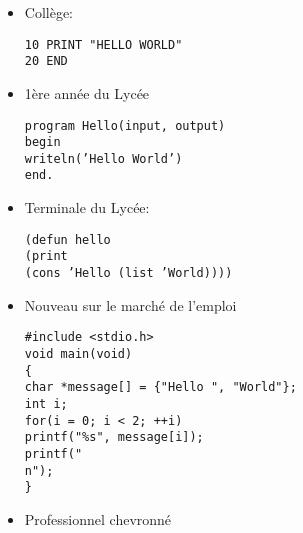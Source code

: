 \begin{itemize}
	\item Collège:

 \texttt{10 PRINT "HELLO WORLD"\\
20 END}

	\item 1ère année du Lycée

\texttt{program Hello(input, output)\\
begin\\
writeln('Hello World')\\
end.}

	\item Terminale du Lycée:
	
\texttt{(defun hello\\
(print\\
(cons 'Hello (list 'World))))}

	\item Nouveau sur le marché de l'emploi

\texttt{\#include <stdio.h>\\
void main(void)\\
\{\\
char *message[] = \{"Hello ", "World"\};\\
int i;\\
for(i = 0; i < 2; ++i)\\
printf("\%s", message[i]);\\
printf("\\n");\\
\}}

	\item Professionnel chevronné
	

\end{itemize}
